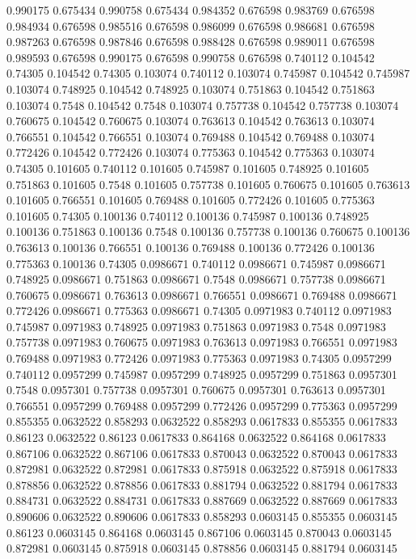 0.990175 0.675434
0.990758 0.675434
0.984352 0.676598
0.983769 0.676598
0.984934 0.676598
0.985516 0.676598
0.986099 0.676598
0.986681 0.676598
0.987263 0.676598
0.987846 0.676598
0.988428 0.676598
0.989011 0.676598
0.989593 0.676598
0.990175 0.676598
0.990758 0.676598
0.740112 0.104542
0.74305 0.104542
0.74305 0.103074
0.740112 0.103074
0.745987 0.104542
0.745987 0.103074
0.748925 0.104542
0.748925 0.103074
0.751863 0.104542
0.751863 0.103074
0.7548 0.104542
0.7548 0.103074
0.757738 0.104542
0.757738 0.103074
0.760675 0.104542
0.760675 0.103074
0.763613 0.104542
0.763613 0.103074
0.766551 0.104542
0.766551 0.103074
0.769488 0.104542
0.769488 0.103074
0.772426 0.104542
0.772426 0.103074
0.775363 0.104542
0.775363 0.103074
0.74305 0.101605
0.740112 0.101605
0.745987 0.101605
0.748925 0.101605
0.751863 0.101605
0.7548 0.101605
0.757738 0.101605
0.760675 0.101605
0.763613 0.101605
0.766551 0.101605
0.769488 0.101605
0.772426 0.101605
0.775363 0.101605
0.74305 0.100136
0.740112 0.100136
0.745987 0.100136
0.748925 0.100136
0.751863 0.100136
0.7548 0.100136
0.757738 0.100136
0.760675 0.100136
0.763613 0.100136
0.766551 0.100136
0.769488 0.100136
0.772426 0.100136
0.775363 0.100136
0.74305 0.0986671
0.740112 0.0986671
0.745987 0.0986671
0.748925 0.0986671
0.751863 0.0986671
0.7548 0.0986671
0.757738 0.0986671
0.760675 0.0986671
0.763613 0.0986671
0.766551 0.0986671
0.769488 0.0986671
0.772426 0.0986671
0.775363 0.0986671
0.74305 0.0971983
0.740112 0.0971983
0.745987 0.0971983
0.748925 0.0971983
0.751863 0.0971983
0.7548 0.0971983
0.757738 0.0971983
0.760675 0.0971983
0.763613 0.0971983
0.766551 0.0971983
0.769488 0.0971983
0.772426 0.0971983
0.775363 0.0971983
0.74305 0.0957299
0.740112 0.0957299
0.745987 0.0957299
0.748925 0.0957299
0.751863 0.0957301
0.7548 0.0957301
0.757738 0.0957301
0.760675 0.0957301
0.763613 0.0957301
0.766551 0.0957299
0.769488 0.0957299
0.772426 0.0957299
0.775363 0.0957299
0.855355 0.0632522
0.858293 0.0632522
0.858293 0.0617833
0.855355 0.0617833
0.86123 0.0632522
0.86123 0.0617833
0.864168 0.0632522
0.864168 0.0617833
0.867106 0.0632522
0.867106 0.0617833
0.870043 0.0632522
0.870043 0.0617833
0.872981 0.0632522
0.872981 0.0617833
0.875918 0.0632522
0.875918 0.0617833
0.878856 0.0632522
0.878856 0.0617833
0.881794 0.0632522
0.881794 0.0617833
0.884731 0.0632522
0.884731 0.0617833
0.887669 0.0632522
0.887669 0.0617833
0.890606 0.0632522
0.890606 0.0617833
0.858293 0.0603145
0.855355 0.0603145
0.86123 0.0603145
0.864168 0.0603145
0.867106 0.0603145
0.870043 0.0603145
0.872981 0.0603145
0.875918 0.0603145
0.878856 0.0603145
0.881794 0.0603145
